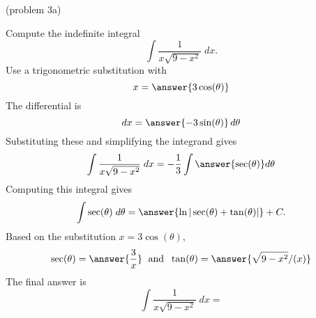 \documentclass[handout]{ximera}
\begin{document}
\begin{problem}(problem 3a)

Compute the indefinite integral
\[
\int \frac{1}{x\sqrt{9-x^2}}  \; dx.
\]
Use a trigonometric substitution with\\
\[
x = \answer{3\cos(\theta)}
\]
The differential is\\
\[
dx = \answer{-3\sin(\theta)}\,d\theta
\]
Substituting these and simplifying the integrand gives\\
\[
\int \frac{1}{x\sqrt{9-x^2}}  \; dx = -\frac13\int \answer{\sec(\theta)} d\theta
\]
Computing this integral gives
\[
\int \sec(\theta) \; d\theta = \answer{\ln|\sec(\theta) + \tan(\theta)|} + C.
\]
Based on the substitution $x = 3 \cos(\theta)$, \\
\[
\sec(\theta) = \answer{\frac{3}{x}} \; \text{ and } \; \tan(\theta) = \answer{\sqrt{9-x^2}/(x)}
\]
The final answer is
\[
\int  \frac{1}{x\sqrt{9-x^2}}  \; dx = 
\]
\begin{center}
\begin{multipleChoice}
\end{multipleChoice}
\end{center}

\end{problem}
\end{document}
